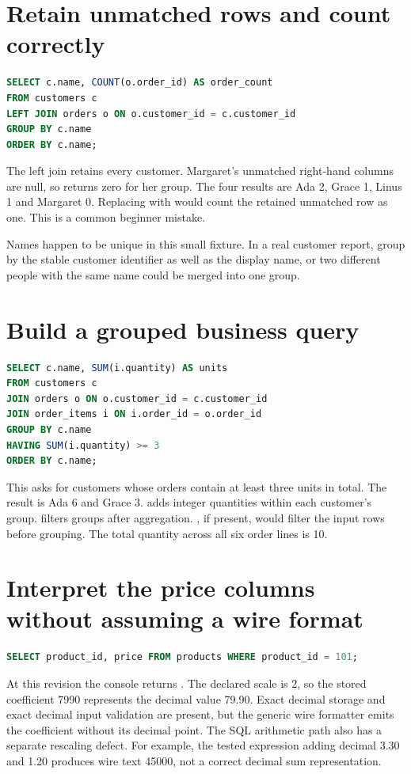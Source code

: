 \section{Retain unmatched rows and count correctly}
\begin{lstlisting}[language=SQL]
SELECT c.name, COUNT(o.order_id) AS order_count
FROM customers c
LEFT JOIN orders o ON o.customer_id = c.customer_id
GROUP BY c.name
ORDER BY c.name;
\end{lstlisting}
The left join retains every customer. Margaret's unmatched right-hand
columns are null, so  returns zero for her group.
The four results are Ada 2, Grace 1, Linus 1 and Margaret 0. Replacing
 with  would count the retained
unmatched row as one. This is a common beginner mistake.

Names happen to be unique in this small fixture. In a real customer report,
group by the stable customer identifier as well as the display name, or two
different people with the same name could be merged into one group.

\section{Build a grouped business query}
\begin{lstlisting}[language=SQL]
SELECT c.name, SUM(i.quantity) AS units
FROM customers c
JOIN orders o ON o.customer_id = c.customer_id
JOIN order_items i ON i.order_id = o.order_id
GROUP BY c.name
HAVING SUM(i.quantity) >= 3
ORDER BY c.name;
\end{lstlisting}
This asks for customers whose orders contain at least three units in total.
The result is Ada 6 and Grace 3.  adds integer
quantities within each customer's group.  filters groups after
aggregation. , if present, would filter the input rows before
grouping. The total quantity across all six order lines is 10.


\section{Interpret the price columns without assuming a wire format}
\begin{lstlisting}[language=SQL]
SELECT product_id, price FROM products WHERE product_id = 101;
\end{lstlisting}
At this revision the console returns . The declared scale is
2, so the stored coefficient 7990 represents the decimal value 79.90.
Exact decimal storage and exact decimal input validation are present, but
the generic wire formatter emits the coefficient without its decimal point.
The SQL arithmetic path also has a separate rescaling defect. For example,
the tested expression adding decimal 3.30 and 1.20 produces wire text 45000,
not a correct decimal sum representation.

